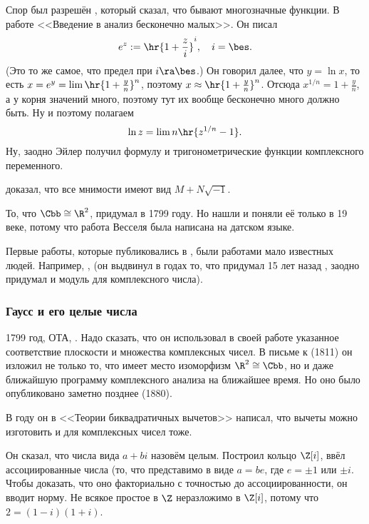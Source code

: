 \documentclass[a4paper,oneside,fleqn,10pt]{article}
\begin{document}
Спор был разрешён , который сказал, что бывают
многозначные функции.  В работе <<Введение в анализ бесконечно
малых>>.  Он писал
$$e^z := \hr{1 + \frac{z}{i}}^i, \quad i = \bes.$$ (Это то же самое,
что предел при $i \ra \bes$.)  Он говорил далее, что $y = \ln x$, то
есть $x = e^y = \lim\hr{1 + \frac{y}{n}}^n$, поэтому $x \approx \hr{1
  + \frac{y}{n}}^n$.  Отсюда $x^{1/n} = 1 + \frac{y}{n}$, а у корня
значений много, поэтому тут их вообще бесконечно много должно быть. Ну
и поэтому полагаем
$$\ln z = \lim n \hr{z^{1/n} - 1}.$$ Ну, заодно Эйлер получил формулу
 и тригонометрические функции комплексного
переменного.

 доказал, что все мнимости имеют вид $M + N \sqrt{-1}$.

То, что $\Cbb \cong \R^2$, придумал    в 1799 году. Но нашли и
поняли её только в 19 веке, потому что работа Весселя была написана на
датском языке.

Первые работы, которые публиковались в , были работами мало
известных людей.  Например, ,  (он выдвинул в
 годах то, что придумал 15 лет назад ,
заодно придумал и модуль для комплексного числа).

\subsubsection{Гаусс и его целые числа}

1799 год, ОТА, . Надо сказать, что он использовал в своей
работе указанное соответствие плоскости и множества комплексных чисел.
В письме к  (1811) он изложил не только то,
что имеет место изоморфизм $\R^2 \cong \Cbb$, но и даже ближайшую
программу комплексного анализа на ближайшее время. Но оно было
опубликовано заметно позднее (1880).

В  году он в <<Теории биквадратичных вычетов>> написал,
что вычеты можно изготовить и для комплексных чисел тоже.

Он сказал, что числа вида $a+ bi$ назовём целым. Построил кольцо
$\Z[i]$, ввёл ассоциированные числа (то, что представимо в виде $a =
be$, где $e = \pm1$ или $\pm i$.  Чтобы доказать, что оно факториально
с точностью до ассоциированности, он вводит норму.  Не всякое простое
в $\Z$ неразложимо в $\Z[i]$, потому что $2 = (1-i)(1+i)$.
\end{document}
